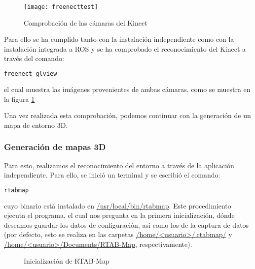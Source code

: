 \begin{figure}[b]
\centering
\texttt{[image: freenecttest]}
\caption{Comprobación de las cámaras del Kinect}
\label{figure:freenecttest}
\end{figure}

Para ello se ha cumplido tanto con la instalación independiente como con la instalación integrada a ROS y se ha comprobado el reconocimiento del Kinect a través del comando:

\begin{blackcodebox}
\begin{lstlisting}[language=bash]
freenect-glview
\end{lstlisting}
\end{blackcodebox}

el cual muestra las imágenes provenientes de ambas cámaras, como se muestra en la figura \ref{figure:freenecttest}

Una vez realizada esta comprobación, podemos continuar con la generación de un mapa de entorno 3D.

\subsubsection{Generación de mapas 3D}

Para esto, realizamos el reconocimiento del entorno a través de la aplicación independiente. Para ello, se inició un terminal y se escribió el comando:

\begin{blackcodebox}
\begin{lstlisting}[language=bash]
rtabmap
\end{lstlisting}
\end{blackcodebox}

cuyo binario está instalado en \url{/usr/local/bin/rtabmap}. Este procedimiento ejecuta el programa, el cual nos pregunta en la primera inicialización, dónde deseamos guardar los datos de configuración, así como los de la captura de datos (por defecto, esto se realiza en las carpetas \url{/home/<usuario>/.rtabmap/} y \url{/home/<usuario>/Documents/RTAB-Map}, respectivamente).

\begin{figure}[hb]
\centering
{}\hspace{1em}%
\caption{Inicialización de RTAB-Map}
\label{figure:rtabmapinit}
\end{figure}


